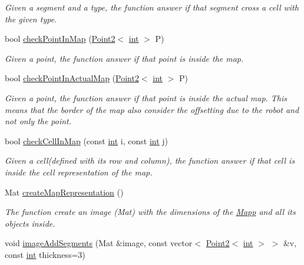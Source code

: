 \begin{DoxyCompactItemize}
\begin{DoxyCompactList}\small\item\em Given a segment and a type, the function answer if that segment cross a cell with the given type. \end{DoxyCompactList}\item 
bool \mbox{\hyperlink{class_mapp_a149e89aed82f5fce047b03c9f90ccbf6}{check\+Point\+In\+Map}} (\mbox{\hyperlink{class_point2}{Point2}}$<$ \mbox{\hyperlink{draw_8hh_aa620a13339ac3a1177c86edc549fda9b}{int}} $>$ P)
\begin{DoxyCompactList}\small\item\em Given a point, the function answer if that point is inside the map. \end{DoxyCompactList}\item 
bool \mbox{\hyperlink{class_mapp_ab60aadab3165415fbf30b619127386ac}{check\+Point\+In\+Actual\+Map}} (\mbox{\hyperlink{class_point2}{Point2}}$<$ \mbox{\hyperlink{draw_8hh_aa620a13339ac3a1177c86edc549fda9b}{int}} $>$ P)
\begin{DoxyCompactList}\small\item\em Given a point, the function answer if that point is inside the actual map. This means that the border of the map also consider the offsetting due to the robot and not only the point. \end{DoxyCompactList}\item 
bool \mbox{\hyperlink{class_mapp_aa06a697fa261aec5d422b00e6c0219c4}{check\+Cell\+In\+Map}} (const \mbox{\hyperlink{draw_8hh_aa620a13339ac3a1177c86edc549fda9b}{int}} i, const \mbox{\hyperlink{draw_8hh_aa620a13339ac3a1177c86edc549fda9b}{int}} j)
\begin{DoxyCompactList}\small\item\em Given a cell(defined with its row and column), the function answer if that cell is inside the cell representation of the map. \end{DoxyCompactList}\item 
Mat \mbox{\hyperlink{class_mapp_ab68b0efc22947a8f78b3436bbfe3330c}{create\+Map\+Representation}} ()
\begin{DoxyCompactList}\small\item\em The function create an image (Mat) with the dimensions of the \mbox{\hyperlink{class_mapp}{Mapp}} and all its objects inside. \end{DoxyCompactList}\item 
void \mbox{\hyperlink{class_mapp_a54335f37b7cbe33eaa37e868225f9585}{image\+Add\+Segments}} (Mat \&image, const vector$<$ \mbox{\hyperlink{class_point2}{Point2}}$<$ \mbox{\hyperlink{draw_8hh_aa620a13339ac3a1177c86edc549fda9b}{int}} $>$ $>$ \&v, const \mbox{\hyperlink{draw_8hh_aa620a13339ac3a1177c86edc549fda9b}{int}} thickness=3)

\end{DoxyCompactItemize}
